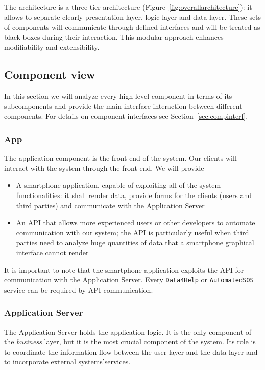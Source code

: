 \documentclass[../DD0.tex]{subfiles}
\begin{document}
    The architecture is a three-tier architecture (Figure~\ref{fig:overallarchitecture}): it allows to separate clearly presentation layer, logic layer and data layer. These sets of components will communicate through defined interfaces and will be treated as black boxes during their interaction. This modular approach enhances modifiability and extensibility.

  \subsection{Component view}
  \label{sec:compview}

    In this section we will analyze every high-level component in terms of its subcomponents and provide the main interface interaction between different components. For details on component interfaces see Section~\ref{sec:compinterf}.

      \subsubsection{App}

        The application component is the front-end of the system. Our clients will interact with the system through the front end. We will provide
        \begin{itemize}
          \item A smartphone application, capable of exploiting all of the system functionalities: it shall render data, provide forms for the clients (users and third parties) and communicate with the Application Server
          \item An API that allows more experienced users or other developers to automate communication with our system; the API is particularly useful when third parties need to analyze huge quantities of data that a smartphone graphical interface cannot render
        \end{itemize}

        It is important to note that the smartphone application exploits the API for communication with the Application Server. Every \texttt{Data4Help} or \texttt{AutomatedSOS} service can be required by API communication.

      \subsubsection{Application Server}

        The Application Server holds the application logic. It is the only component of the \textit{business} layer, but it is the most crucial component of the system. Its role is to coordinate the information flow between the user layer and the data layer and to incorporate external systems'services.
\end{document}
